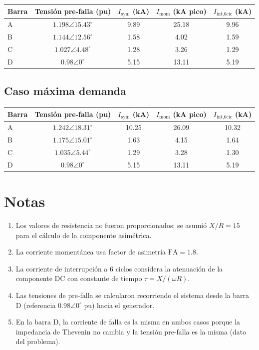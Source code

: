 \documentclass[12pt,a4paper]{article}
\begin{document}
\begin{center}
\begin{tabular}{lcccc}
\toprule
Barra & Tensión pre-falla (pu) & $I_{\text{sym}}$ (kA) & $I_{\text{mom}}$ (kA pico) & $I_{\text{int,6cic}}$ (kA) \\
\midrule
A & $1.198\angle15.43^\circ$ & 9.89 & 25.18 & 9.96 \\
B & $1.144\angle12.56^\circ$ & 1.58 & 4.02 & 1.59 \\
C & $1.027\angle4.48^\circ$ & 1.28 & 3.26 & 1.29 \\
D & $0.98\angle0^\circ$ & 5.15 & 13.11 & 5.19 \\
\bottomrule
\end{tabular}
\end{center}

\subsection{Caso máxima demanda}

\begin{center}
\begin{tabular}{lcccc}
\toprule
Barra & Tensión pre-falla (pu) & $I_{\text{sym}}$ (kA) & $I_{\text{mom}}$ (kA pico) & $I_{\text{int,6cic}}$ (kA) \\
\midrule
A & $1.242\angle18.31^\circ$ & 10.25 & 26.09 & 10.32 \\
B & $1.175\angle15.01^\circ$ & 1.63 & 4.15 & 1.64 \\
C & $1.035\angle5.44^\circ$ & 1.29 & 3.28 & 1.30 \\
D & $0.98\angle0^\circ$ & 5.15 & 13.11 & 5.19 \\
\bottomrule
\end{tabular}
\end{center}

\section*{Notas}
\begin{enumerate}
    \item Los valores de resistencia no fueron proporcionados; se asumió $X/R = 15$ para el cálculo de la componente asimétrica.
    \item La corriente momentánea usa factor de asimetría $\text{FA} = 1.8$.
    \item La corriente de interrupción a 6 ciclos considera la atenuación de la componente DC con constante de tiempo $\tau = X/(\omega R)$.
    \item Las tensiones de pre-falla se calcularon recorriendo el sistema desde la barra D (referencia $0.98\angle0^\circ$ pu) hacia el generador.
    \item En la barra D, la corriente de falla es la misma en ambos casos porque la impedancia de Thevenin no cambia y la tensión pre-falla es la misma (dato del problema).
\end{enumerate}
\end{document}
